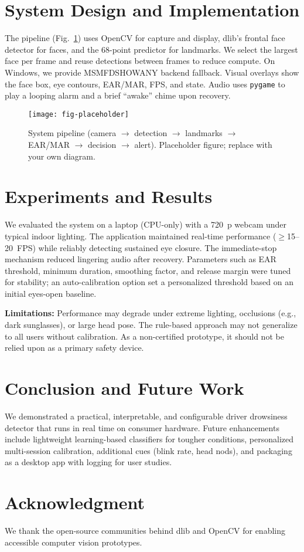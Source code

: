 \documentclass[conference]{IEEEtran}
\begin{document}
\section{System Design and Implementation}
The pipeline (Fig.~\ref{fig:pipeline}) uses OpenCV for capture and display, dlib's frontal face detector for faces, and the 68-point predictor for landmarks. We select the largest face per frame and reuse detections between frames to reduce compute. On Windows, we provide MSMF\textrightarrow DSHOW\textrightarrow ANY backend fallback. Visual overlays show the face box, eye contours, EAR/MAR, FPS, and state. Audio uses \texttt{pygame} to play a looping alarm and a brief ``awake'' chime upon recovery.

\begin{figure}[t]
    \centering
    \texttt{[image: fig-placeholder]}
    \caption{System pipeline (camera $\to$ detection $\to$ landmarks $\to$ EAR/MAR $\to$ decision $\to$ alert). Placeholder figure; replace with your own diagram.}
    \label{fig:pipeline}
\end{figure}

\section{Experiments and Results}
We evaluated the system on a laptop (CPU-only) with a \SI{720}{p} webcam under typical indoor lighting. The application maintained real-time performance (\(\geq\)15--20~FPS) while reliably detecting sustained eye closure. The immediate-stop mechanism reduced lingering audio after recovery. Parameters such as EAR threshold, minimum duration, smoothing factor, and release margin were tuned for stability; an auto-calibration option set a personalized threshold based on an initial eyes-open baseline.

\textbf{Limitations:} Performance may degrade under extreme lighting, occlusions (e.g., dark sunglasses), or large head pose. The rule-based approach may not generalize to all users without calibration. As a non-certified prototype, it should not be relied upon as a primary safety device.

\section{Conclusion and Future Work}
We demonstrated a practical, interpretable, and configurable driver drowsiness detector that runs in real time on consumer hardware. Future enhancements include lightweight learning-based classifiers for tougher conditions, personalized multi-session calibration, additional cues (blink rate, head nods), and packaging as a desktop app with logging for user studies.

\section*{Acknowledgment}
We thank the open-source communities behind dlib and OpenCV for enabling accessible computer vision prototypes.



\end{document}
